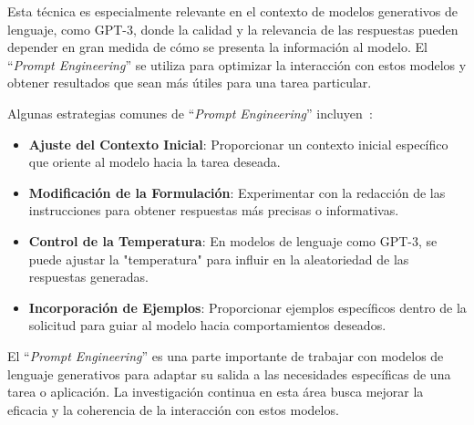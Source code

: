 Esta técnica es especialmente relevante en el contexto de modelos 
generativos de lenguaje, como GPT-3, donde la calidad y la 
relevancia de las respuestas pueden depender en gran medida 
de cómo se presenta la información al modelo. 
El ``\emph{Prompt Engineering}'' se utiliza para optimizar la interacción 
con estos modelos y obtener resultados que sean más útiles 
para una tarea particular.

Algunas estrategias comunes de ``\emph{Prompt Engineering}'' incluyen~\cite{white2023prompt}:
\begin{itemize}
	\item \textbf{Ajuste del Contexto Inicial}: Proporcionar un contexto inicial específico que oriente al modelo hacia la tarea deseada.
	\item \textbf{Modificación de la Formulación}: Experimentar con la redacción de las instrucciones para obtener respuestas más precisas o informativas.
	\item \textbf{Control de la Temperatura}: En modelos de lenguaje como GPT-3, se puede ajustar la "temperatura" para influir en la aleatoriedad de las respuestas generadas.
	\item \textbf{Incorporación de Ejemplos}: Proporcionar ejemplos específicos dentro de la solicitud para guiar al modelo hacia comportamientos deseados.
\end{itemize}
El ``\emph{Prompt Engineering}'' es una parte importante de trabajar con modelos de lenguaje generativos para adaptar su salida a las necesidades específicas de una tarea o aplicación. 
La investigación continua en esta área busca mejorar la eficacia y la coherencia de la interacción con estos modelos.

